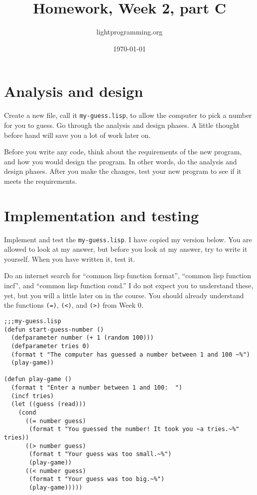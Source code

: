 \documentclass{article}
\title{Homework, Week 2, part C}
\author{lightprogramming.org}
\date{\today}
\begin{document}
\maketitle{}

\section{Analysis and design}

Create a new file, call it \texttt{my-guess.lisp}, to allow the computer to pick a number for you to guess. Go through the analysis and design phases. A little thought before hand will save you a lot of work later on.

 Before you write any code, think about the requirements of the new program, and how you would design the program. In other words, do the analysis and design phases. After you make the changes, test your new program to see if it meets the requirements.

\section{Implementation and testing}

Implement and test the \texttt{my-guess.lisp}. I have copied my version below. You are allowed to look at my answer, but before you look at my answer, try to write it yourself. When you have written it, test it.

Do an internet search for ``common lisp function format'', ``common lisp function incf'', and ``common lisp function cond.'' I do not expect you to understand these, yet, but you will a little later on in the course. You should already understand the functions \texttt{(=)}, \texttt{(<)}, and \texttt{(>)} from Week 0.

\lstset{language=Lisp,numbers=left,keepspaces=true,basicstyle=\small,numberstyle=\tiny,showstringspaces=false,breaklines=true}
\begin{lstlisting}
;;;my-guess.lisp
(defun start-guess-number ()
  (defparameter number (+ 1 (random 100)))
  (defparameter tries 0)
  (format t "The computer has guessed a number between 1 and 100 ~%")
  (play-game))

(defun play-game ()
  (format t "Enter a number between 1 and 100:  ")
  (incf tries)
  (let ((guess (read)))
    (cond
      ((= number guess)
       (format t "You guessed the number! It took you ~a tries.~%" tries))
      ((> number guess)
       (format t "Your guess was too small.~%")
       (play-game))
      ((< number guess)
       (format t "Your guess was too big.~%")
       (play-game)))))
\end{lstlisting}
\end{document}

